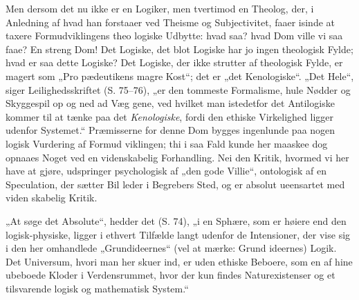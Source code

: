 \documentclass[12pt]{book}
\newcommand{\opage}[1]{\marginnote{\footnotesize\textit{[#1]}}}
\begin{document}
Men dersom det nu ikke er en Logiker, men tvertimod
en Theolog, der, i Anledning af hvad han forstaaer ved Theisme
og Subjectivitet, faaer isinde at taxere Formudviklingens theo\-%
logiske Udbytte: hvad saa? hvad Dom ville vi saa faae?
En streng Dom! Det Logiske, det blot Logiske har jo ingen
theologisk Fylde; hvad er saa dette Logiske? Det Logiske,
der ikke strutter af theologisk Fylde, er magert som „Pro\-%
pædeutikens magre Kost“; det er „det Kenologiske“. „Det
Hele“, siger Leilighedsskriftet (S. 75--76), „er den tommeste
Formalisme, hule Nødder og Skyggespil op og ned ad Væg\-%
gene, ved hvilket man istedetfor det Antilogiske kommer til at
tænke paa det \emph{Kenologiske}, fordi den ethiske Virkelighed
ligger udenfor Systemet.“ Præmisserne for denne Dom
bygges ingenlunde paa nogen logisk Vurdering af Formud\-%
viklingen; thi i saa Fald kunde her maaskee dog opnaaes
Noget ved en videnskabelig Forhandling. Nei den Kritik,
hvormed vi her have at gjøre, udspringer psychologisk af „den
gode Villie“, ontologisk af en Speculation, der sætter Bil\-%
leder i Begrebers Sted, og er absolut ueensartet med viden\-%
skabelig Kritik.

„At søge det Absolute“, hedder det (S. 74), „i en
Sphære, som er høiere end den logisk-physiske, ligger i ethvert
Tilfælde langt udenfor de Intensioner, der vise sig i den
her omhandlede „Grundideernes“ (vel at mærke: Grund\-%
ideernes) Logik. Det Universum, hvori man her skuer ind,
er uden ethiske Beboere, som en af hine ubeboede Kloder i
\opage{130}\setcounter{footnote}{0}%
Verdensrummet, hvor der kun findes Naturexistenser og et
tilsvarende logisk og mathematisk System.“
\end{document}
